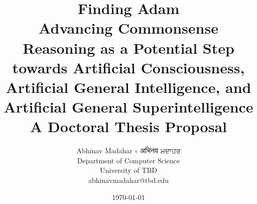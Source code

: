 \title{
    {\huge \textbf{Finding Adam}} \\
    Advancing Commonsense Reasoning as a Potential Step towards Artificial Consciousness, Artificial General Intelligence, and Artificial General Superintelligence
    \vspace{1cm} \\
    A Doctoral Thesis Proposal}

\author{
    Abhinav Madahar $\circ$ {\devanagari अभिनव } {\gurmukhi ਮਦਾਹਰ} \\
    Department of Computer Science \\
    University of TBD \\
    {\small abhinavmadahar@tbd.edu}}

\date{\today}
